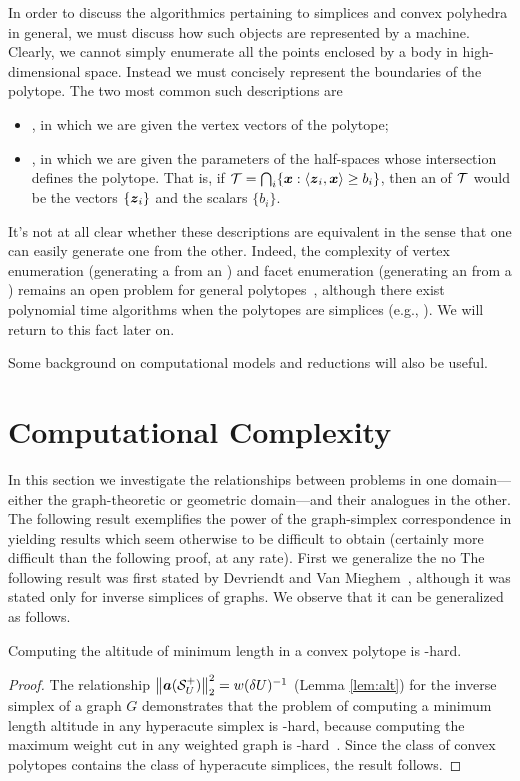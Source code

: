 In order to discuss the algorithmics pertaining to simplices and convex polyhedra in general, we must discuss how such objects are represented by a machine. Clearly, we cannot simply enumerate all the points enclosed by a body in high-dimensional space. Instead we must concisely represent the boundaries of the polytope. The two most common such descriptions are 
\begin{itemize}
	\item \emph{\vdesc}, in which we are given the vertex vectors of the polytope; 
	\item \emph{\hdesc}, in which we are given the parameters of the half-spaces whose intersection defines the polytope. That is, if $\mathcal{T}=\bigcap_i \{\vb*{x}:\langle \vb*{z}_i,\vb*{x}\rangle \geq b_i\}$, then an \hdesc of $\mathcal{T}$ would be the vectors $\{\vb*{z}_i\}$ and the scalars $\{b_i\}$. 
\end{itemize}

It's not at all clear whether these descriptions are equivalent in the sense that one can easily generate one from the other. Indeed, the complexity of vertex enumeration (generating a \vdesc from an \hdesc) and facet enumeration (generating an \hdesc from a \vdesc) remains an open problem for general polytopes~\cite{kaibel2003some}, although there exist polynomial time algorithms when the polytopes are simplices (e.g., \cite{bremner1998primal}). We will return to this fact later on. 

Some background on computational models and reductions will also be useful. \todo \\



\section{Computational Complexity}

In this section we investigate the relationships between problems in one domain---either the graph-theoretic or geometric domain---and their analogues in the other. The following result exemplifies the power of the graph-simplex correspondence in yielding results which seem otherwise to be difficult to obtain (certainly more difficult than the following proof, at any rate).  First we generalize the no
The following result was first stated by Devriendt and Van Mieghem~\cite{devriendt2018simplex}, although it was stated only for inverse simplices of graphs. We observe that it can be generalized as follows. 

\begin{lemma}
	Computing the altitude of minimum length in a convex polytope is \NP-hard. 
\end{lemma}
\begin{proof}
	The relationship $\norm{\vb*{a}(\mathcal{S}^+_U)}_2^2 = w(\delta U)^{-1}$ (Lemma \ref{lem:alt}) for the inverse simplex of a graph $G$ demonstrates that the problem of computing a minimum length altitude in any hyperacute simplex is \NP-hard, because computing the  maximum weight cut in any weighted graph is \NP-hard~\cite{karp1972reducibility}.  Since the class of convex polytopes contains the class of hyperacute simplices, the result follows. 
\end{proof}


